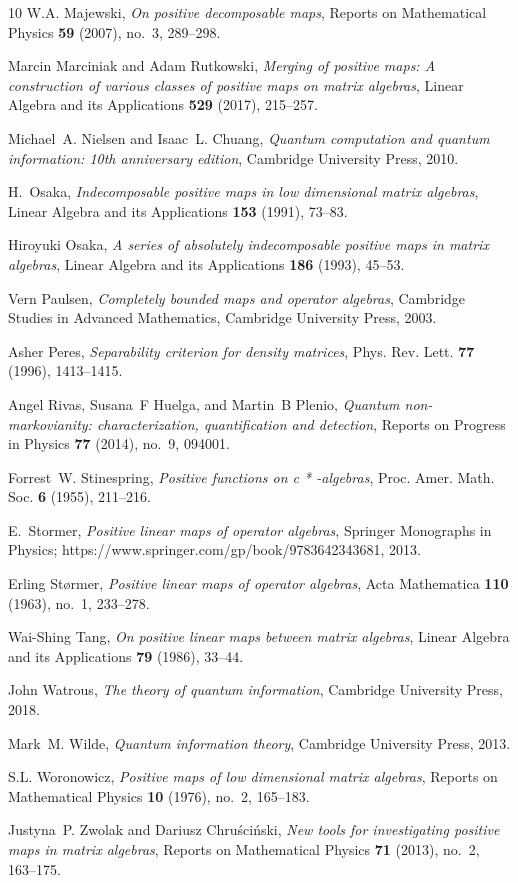 \documentclass[12pt]{amsart}
\numberwithin{equation}{section}
\begin{document}
\begin{thebibliography}{10}
W.A. Majewski, \emph{On positive decomposable maps}, Reports on Mathematical
  Physics \textbf{59} (2007), no.~3, 289--298.

Marcin Marciniak and Adam Rutkowski, \emph{Merging of positive maps: A
  construction of various classes of positive maps on matrix algebras}, Linear
  Algebra and its Applications \textbf{529} (2017), 215--257.

Michael~A. Nielsen and Isaac~L. Chuang, \emph{Quantum computation and quantum
  information: 10th anniversary edition}, Cambridge University Press, 2010.

H.~Osaka, \emph{Indecomposable positive maps in low dimensional matrix
  algebras}, Linear Algebra and its Applications \textbf{153} (1991), 73--83.

Hiroyuki Osaka, \emph{A series of absolutely indecomposable positive maps in
  matrix algebras}, Linear Algebra and its Applications \textbf{186} (1993),
  45--53.

Vern Paulsen, \emph{Completely bounded maps and operator algebras}, Cambridge
  Studies in Advanced Mathematics, Cambridge University Press, 2003.

Asher Peres, \emph{Separability criterion for density matrices}, Phys. Rev.
  Lett. \textbf{77} (1996), 1413--1415.

Angel Rivas, Susana~F Huelga, and Martin~B Plenio, \emph{Quantum
  non-markovianity: characterization, quantification and detection}, Reports on
  Progress in Physics \textbf{77} (2014), no.~9, 094001.

Forrest~W. Stinespring, \emph{Positive functions on c * -algebras}, Proc. Amer.
  Math. Soc. \textbf{6} (1955), 211--216.

E.~Stormer, \emph{Positive linear maps of operator algebras}, Springer
  Monographs in Physics; https://www.springer.com/gp/book/9783642343681, 2013.

Erling St{\o}rmer, \emph{Positive linear maps of operator algebras}, Acta
  Mathematica \textbf{110} (1963), no.~1, 233--278.

Wai-Shing Tang, \emph{On positive linear maps between matrix algebras}, Linear
  Algebra and its Applications \textbf{79} (1986), 33--44.

John Watrous, \emph{The theory of quantum information}, Cambridge University
  Press, 2018.

Mark~M. Wilde, \emph{Quantum information theory}, Cambridge University Press,
  2013.

S.L. Woronowicz, \emph{Positive maps of low dimensional matrix algebras},
  Reports on Mathematical Physics \textbf{10} (1976), no.~2, 165--183.

Justyna~P. Zwolak and Dariusz Chru\'{s}ci\'{n}ski, \emph{New tools for
  investigating positive maps in matrix algebras}, Reports on Mathematical
  Physics \textbf{71} (2013), no.~2, 163--175.

\end{thebibliography}


% 
%
%
%
\end{document}
